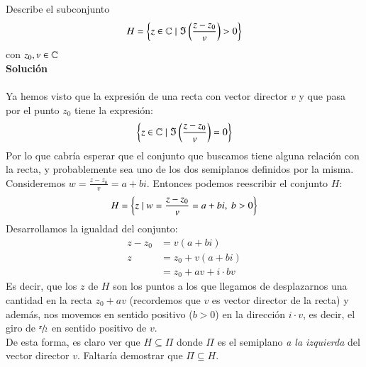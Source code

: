     \begin{th_ex}
        Describe el subconjunto
        $$
            H = \left\{z \in \mathbb{C} \mid \Im\left(\frac{z-z_0}{v}\right) > 0\right\}
        $$
        con $z_0, v \in  \mathbb{C}$\\

        \textbf{Solución}\\\\

        Ya hemos visto que la expresión de una recta con vector director $v$ y que pasa por el punto $z_0$ tiene la expresión:
        $$
            \left\{z \in \mathbb{C} \mid \Im\left(\frac{z-z_0}{v}\right) = 0\right\}
        $$
        Por lo que cabría esperar que el conjunto que buscamos tiene alguna relación con la recta, y probablemente sea uno de los dos semiplanos definidos por la misma.\\
        Consideremos $w = \frac{z-z_0}{v} = a + bi$. Entonces podemos reescribir el conjunto $H$:
        $$
            H = \left\{z \mid w = \frac{z-z_0}{v} = a + bi,\ b>0\right\}
        $$
        Desarrollamos la igualdad del conjunto:
        \begin{align*}
            z - z_0 &= v (a + bi)\\
            z &= z_0 + v(a + bi)\\
                &= z_0 + av + i\cdot bv
        \end{align*}
        Es decir, que los $z$ de $H$ son los puntos a los que llegamos de desplazarnos una cantidad en la recta $z_0 + av$ (recordemos que $v$ es vector director de la recta) y además, nos movemos en sentido positivo ($b>0$) en la dirección $i\cdot v$, es decir, el giro de $\sfrac{\pi}{2}$ en sentido positivo de $v$.\\

        De esta forma, es claro ver que $H \subseteq \Pi$ donde $\Pi$ es el semiplano \textit{a la izquierda} del vector director $v$. Faltaría demostrar que $\Pi \subseteq H$.
    \end{th_ex}

